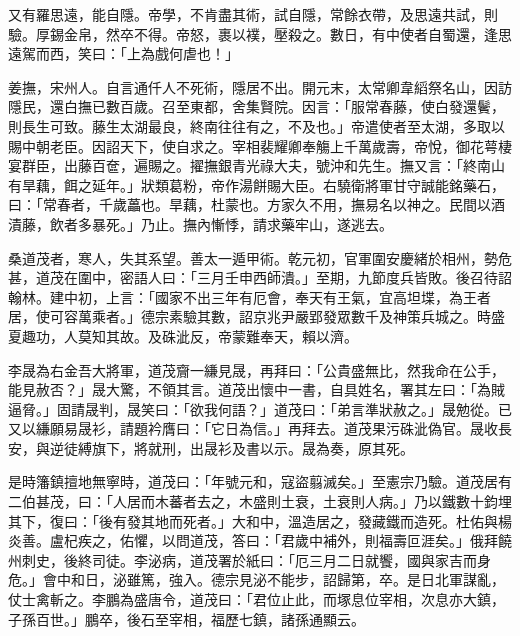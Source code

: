 \begin{pinyinscope}
 又有羅思遠，能自隱。帝學，不肯盡其術，試自隱，常餘衣帶，及思遠共試，則驗。厚錫金帛，然卒不得。帝怒，裹以襆，壓殺之。數日，有中使者自蜀還，逢思遠駕而西，笑曰：「上為戲何虐也！」



 姜撫，宋州人。自言通仟人不死術，隱居不出。開元末，太常卿韋縚祭名山，因訪隱民，還白撫已數百歲。召至東都，舍集賢院。因言：「服常春藤，使白發還鬢，則長生可致。藤生太湖最良，終南往往有之，不及也。」帝遣使者至太湖，多取以賜中朝老臣。因詔天下，使自求之。宰相裴耀卿奉觴上千萬歲壽，帝悅，御花萼棲宴群臣，出藤百奩，遍賜之。擢撫銀青光祿大夫，號沖和先生。撫又言：「終南山有旱藕，餌之延年。」狀類葛粉，帝作湯餅賜大臣。右驍衛將軍甘守誠能銘藥石，曰：「常春者，千歲藟也。旱藕，杜蒙也。方家久不用，撫易名以神之。民間以酒漬藤，飲者多暴死。」乃止。撫內慚悸，請求藥牢山，遂逃去。



 桑道茂者，寒人，失其系望。善太一遁甲術。乾元初，官軍圍安慶緒於相州，勢危甚，道茂在圍中，密語人曰：「三月壬申西師潰。」至期，九節度兵皆敗。後召待詔翰林。建中初，上言：「國家不出三年有厄會，奉天有王氣，宜高坦堞，為王者居，使可容萬乘者。」德宗素驗其數，詔京兆尹嚴郢發眾數千及神策兵城之。時盛夏趣功，人莫知其故。及硃泚反，帝蒙難奉天，賴以濟。



 李晟為右金吾大將軍，道茂齎一縑見晟，再拜曰：「公貴盛無比，然我命在公手，能見赦否？」晟大驚，不領其言。道茂出懷中一書，自具姓名，署其左曰：「為賊逼脅。」固請晟判，晟笑曰：「欲我何語？」道茂曰：「弟言準狀赦之。」晟勉從。已又以縑願易晟衫，請題衿膺曰：「它日為信。」再拜去。道茂果污硃泚偽官。晟收長安，與逆徒縛旗下，將就刑，出晟衫及書以示。晟為奏，原其死。



 是時籓鎮擅地無寧時，道茂曰：「年號元和，寇盜翦滅矣。」至憲宗乃驗。道茂居有二伯甚茂，曰：「人居而木蕃者去之，木盛則土衰，土衰則人病。」乃以鐵數十鈞埋其下，復曰：「後有發其地而死者。」大和中，溫造居之，發藏鐵而造死。杜佑與楊炎善。盧杞疾之，佑懼，以問道茂，答曰：「君歲中補外，則福壽叵涯矣。」俄拜饒州刺史，後終司徒。李泌病，道茂署於紙曰：「厄三月二日就饗，國與家吉而身危。」會中和日，泌雖篤，強入。德宗見泌不能步，詔歸第，卒。是日北軍謀亂，仗士禽斬之。李鵬為盛唐令，道茂曰：「君位止此，而塚息位宰相，次息亦大鎮，子孫百世。」鵬卒，後石至宰相，福歷七鎮，諸孫通顯云。



\end{pinyinscope}